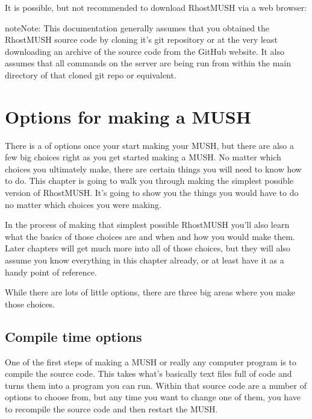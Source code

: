 \documentclass[letterpaper,10pt,english]{sphinxmanual}
\begin{document}
\sphinxAtStartPar
It is possible, but not recommended to download RhostMUSH via a web browser:

\begin{sphinxVerbatim}[commandchars=\\\{\}]
\end{sphinxVerbatim}

\begin{sphinxadmonition}{note}{Note:}
\sphinxAtStartPar
This documentation generally assumes that you obtained the RhostMUSH source
code by cloning it’s git repository or at the very least downloading an
archive of the source code from the GitHub website. It also assumes that
all commands on the server are being run from within the main directory of
that cloned git repo or equivalent.
\end{sphinxadmonition}


\section{Options for making a MUSH}
\label{\detokenize{install:options-for-making-a-mush}}
\sphinxAtStartPar
There is a  of options once your start making your MUSH, but there are
also a few big choices right as you get started making a MUSH. No matter which
choices you ultimately make, there are certain things you will need to know how
to do. This chapter is going to walk you through making the simplest possible
version of RhostMUSH. It’s going to show you the things you would have to do
no matter which choices you were making.

\sphinxAtStartPar
In the process of making that simplest possible RhostMUSH you’ll also learn
what the basics of those choices are and when and how you would make them.
Later chapters will get much more into all of those choices, but they will also
assume you know everything in this chapter already, or at least have it as a
handy point of reference.

\sphinxAtStartPar
While there are lots of little options, there are three big areas where you
make those choices.


\subsection{Compile time options}
\label{\detokenize{install:compile-time-options}}
\sphinxAtStartPar
One of the first steps of making a MUSH or really any computer program is
to compile the source code. This takes what’s basically text files full of code
and turns them into a program you can run. Within that source code are a
number of options to choose from, but any time you want to change one of them,
you have to recompile the source code and then restart the MUSH.
\end{document}
